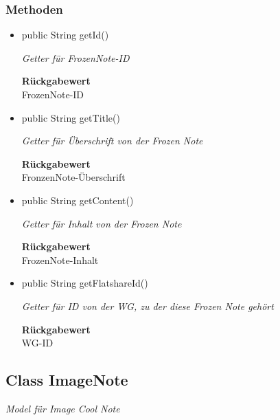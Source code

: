 \documentclass[a4paper]{scrreprt}
\begin{document}
    \subsubsection{Methoden}
    \begin{itemize}
    	\item{public String getId()}
    	
    	\textit{Getter für FrozenNote-ID}
    	
    	
    	
    	\textbf{Rückgabewert} \\
    	FrozenNote-ID        \item{public String getTitle()}
    	
    	\textit{Getter für Überschrift von der Frozen Note}
    	
    	
    	
    	\textbf{Rückgabewert} \\
    	FronzenNote-Überschrift        \item{public String getContent()}
    	
    	\textit{Getter für Inhalt von der Frozen Note}
    	
    	
    	
    	\textbf{Rückgabewert} \\
    	FrozenNote-Inhalt        \item{public String getFlatshareId()}
    	
    	\textit{Getter für ID von der WG, zu der diese Frozen Note gehört}
    	
    	
    	
    	\textbf{Rückgabewert} \\
    	WG-ID
    \end{itemize}
    \subsection{Class ImageNote}
    \textit{Model für Image Cool Note}
\end{document}
